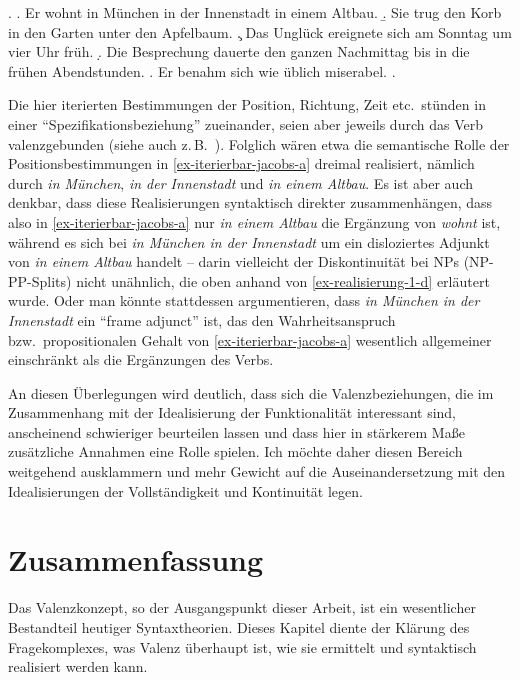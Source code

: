 \ex.\label{ex-iterierbar-jacobs}
\a. Er wohnt in München in der Innenstadt in einem Altbau.\label{ex-iterierbar-jacobs-a}
\b. Sie trug den Korb in den Garten unter den Apfelbaum.
\c. Das Unglück ereignete sich am Sonntag um vier Uhr früh.
\d. Die Besprechung dauerte den ganzen Nachmittag bis in die frühen Abendstunden.
\e. Er benahm sich wie üblich miserabel.
\z. \citep[(11), (13)--(15)]{Jacobs:94}

Die hier iterierten Bestimmungen der Position, Richtung, Zeit etc.\ stünden in einer "`Spezifikationsbeziehung"' zueinander, seien aber jeweils durch das Verb valenzgebunden (siehe auch z.\,B.\ \citealt{Maienborn:91, Steinitz:92}). Folglich wären etwa die semantische Rolle der Positionsbestimmungen in \ref{ex-iterierbar-jacobs-a} dreimal realisiert, nämlich durch \textit{in München}, \textit{in der Innenstadt} und \textit{in einem Altbau}. Es ist aber auch denkbar, dass diese Realisierungen syntaktisch direkter zusammenhängen, dass also in \ref{ex-iterierbar-jacobs-a} nur \textit{in einem Altbau} die Ergänzung  von \textit{wohnt} ist, während es sich bei \textit{in München in der Innenstadt}  um ein disloziertes Adjunkt von \textit{in einem Altbau} handelt -- darin vielleicht der Diskontinuität bei NPs (NP-PP-Splits) nicht unähnlich, die oben anhand von \ref{ex-realisierung-1-d} erläutert wurde. Oder man könnte stattdessen argumentieren, dass \textit{in München in der Innenstadt} ein  "`frame adjunct"' \citep{Maienborn:01,Frey:03} ist, das den Wahrheitsanspruch bzw.\ propositionalen Gehalt von \ref{ex-iterierbar-jacobs-a} wesentlich allgemeiner einschränkt als die Ergänzungen des Verbs. 

An diesen Überlegungen wird deutlich, dass sich die Valenzbeziehungen, die im Zusammenhang mit der Idealisierung der Funktionalität interessant sind, anscheinend schwieriger beurteilen lassen und dass hier in stärkerem Maße zusätzliche Annahmen eine Rolle spielen. Ich möchte daher diesen Bereich weitgehend ausklammern und mehr Gewicht auf die Auseinandersetzung mit den Idealisierungen der Vollständigkeit und Kontinuität legen.


\section{Zusammenfassung}

Das Valenzkonzept, so der Ausgangspunkt dieser Arbeit, ist ein wesentlicher Bestandteil heutiger Syntaxtheorien. Dieses Kapitel diente der Klärung des Fragekomplexes, was Valenz überhaupt ist, wie sie ermittelt und syntaktisch realisiert werden kann. 

